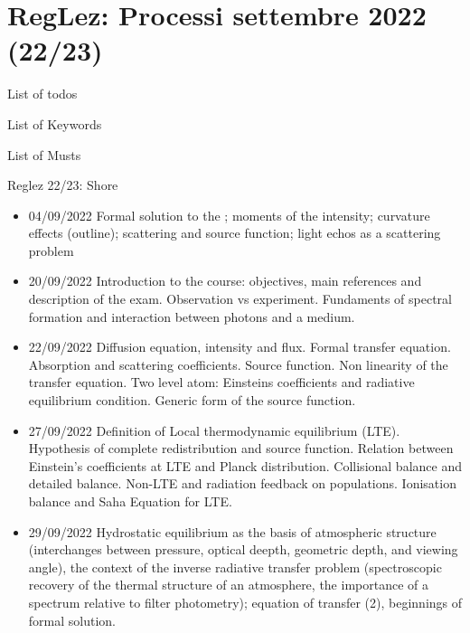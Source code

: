 \section{RegLez: Processi settembre 2022 (22/23)}

\begin{frame}[allowframebreaks]{List of todos}
\listoftodos
\end{frame} 

\begin{frame}[allowframebreaks]{List of Keywords}
\listofkeywords
\end{frame}    

\begin{frame}[allowframebreaks]{List of Musts}
\listofmusts
\end{frame}


\begin{frame}[allowframebreaks]{Reglez 22/23: Shore}
    \begin{itemize}
\item 04/09/2022 Formal solution to the ; moments of the intensity; curvature effects (outline); scattering and source function; light echos as a scattering problem 
\item 20/09/2022 Introduction to the course: objectives, main references and description of the exam. Observation vs experiment. Fundaments of spectral formation and interaction between photons and a medium.
\item 22/09/2022 Diffusion equation, intensity and flux. Formal transfer equation. Absorption and scattering coefficients. Source function. Non linearity of the transfer equation. Two level atom: Einsteins coefficients and radiative equilibrium condition. Generic form of the source function. 
\item 27/09/2022 Definition of Local thermodynamic equilibrium (LTE). Hypothesis of complete redistribution and source function. Relation between Einstein's coefficients at LTE and Planck distribution. Collisional balance and detailed balance. Non-LTE and radiation feedback on populations. Ionisation balance and Saha Equation for LTE. 
\item 29/09/2022 Hydrostatic equilibrium as the basis of atmospheric structure (interchanges between pressure, optical deepth, geometric depth, and viewing angle), the context of the inverse radiative transfer problem (spectroscopic recovery of the thermal structure of an atmosphere, the importance of a spectrum relative to filter photometry); equation of transfer (2), beginnings of formal solution. 

\end{itemize}
\end{frame}
